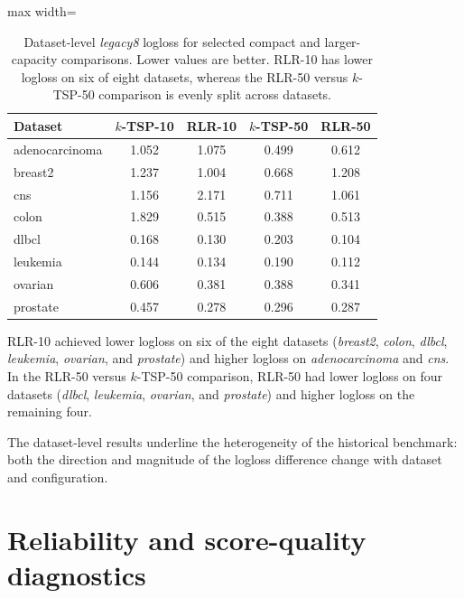 \documentclass[11pt, a4paper]{article}
\newcommand{\stdtablefont}{\small}
\newcommand{\stdtablelayout}{%
  \stdtablefont
  \setlength{\tabcolsep}{4pt}
  \renewcommand{\arraystretch}{1.2}
}
\begin{document}
\begin{table}[!htbp]
\centering
\caption{Dataset-level \emph{legacy8} logloss for selected compact and larger-capacity comparisons. Lower values are better. RLR-10 has lower logloss on six of eight datasets, whereas the RLR-50 versus $k$-TSP-50 comparison is evenly split across datasets.}
\label{tab:legacy_dataset_logloss}
{\stdtablelayout
\begin{adjustbox}{max width=\linewidth}
\begin{tabular}{lcccc}
\toprule
\textbf{Dataset} &
\textbf{$k$-TSP-10} &
\textbf{RLR-10} &
\textbf{$k$-TSP-50} &
\textbf{RLR-50} \\
\midrule
adenocarcinoma & 1.052 & 1.075 & 0.499 & 0.612 \\
breast2        & 1.237 & 1.004 & 0.668 & 1.208 \\
cns            & 1.156 & 2.171 & 0.711 & 1.061 \\
colon          & 1.829 & 0.515 & 0.388 & 0.513 \\
dlbcl          & 0.168 & 0.130 & 0.203 & 0.104 \\
leukemia       & 0.144 & 0.134 & 0.190 & 0.112 \\
ovarian        & 0.606 & 0.381 & 0.388 & 0.341 \\
prostate       & 0.457 & 0.278 & 0.296 & 0.287 \\
\bottomrule
\end{tabular}
\end{adjustbox}
}
\end{table}

RLR-10 achieved lower logloss on six of the eight datasets (\emph{breast2}, \emph{colon}, \emph{dlbcl}, \emph{leukemia}, \emph{ovarian}, and \emph{prostate}) and higher logloss on \emph{adenocarcinoma} and \emph{cns}. In the RLR-50 versus $k$-TSP-50 comparison, RLR-50 had lower logloss on four datasets (\emph{dlbcl}, \emph{leukemia}, \emph{ovarian}, and \emph{prostate}) and higher logloss on the remaining four.

The dataset-level results underline the heterogeneity of the historical benchmark: both the direction and magnitude of the logloss difference change with dataset and configuration.



\section{Reliability and score-quality diagnostics}
\end{document}
